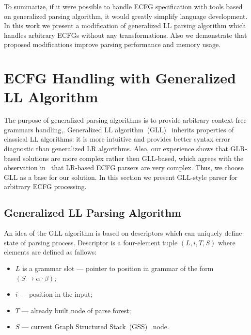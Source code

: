 \documentclass[runningheads,a4paper]{llncs}
\begin{document}
To summarize, if it were possible to handle ECFG specification with tools based on generalized parsing algorithm, it would greatly simplify language development.
In this work we present a modification of generalized LL parsing algorithm which handles arbitrary ECFGs without any transformations.
Also we demonstrate that proposed modifications improve parsing performance and memory usage.

\section{ECFG Handling with Generalized LL Algorithm}%

The purpose of generalized parsing algorithms is to provide arbitrary context-free grammars handling,.
Generalized LL algorithm~(GLL)~\cite{scott2010gll} inherits properties of classical LL algorithms: it is more intuitive and provides better syntax error diagnostic than generalized LR algorithms.
Also, our experience shows that GLR-based solutions are more complex rather then GLL-based, which agrees with the observation in~\cite{ECFG} that LR-based ECFG parsers are very complex. 
Thus, we choose GLL as a base for our solution.
In this section we present GLL-style parser for arbitrary ECFG processing.

\subsection{Generalized LL Parsing Algorithm}%

An idea of the GLL algorithm is based on descriptors which can uniquely define state of parsing process.
Descriptor is a four-element tuple $(L, i, T, S)$ where elements are defined as fallows: 
\begin{itemize}
\item $L$ is a grammar slot --- pointer to position in grammar of the form~$(S \to \alpha \cdot \beta)$;
\item $i$ --- position in the input;
\item $T$ --- already built node of parse forest;
\item $S$ --- current Graph Structured Stack~(GSS)~\cite{GSS} node.
\end{itemize}
\end{document}

